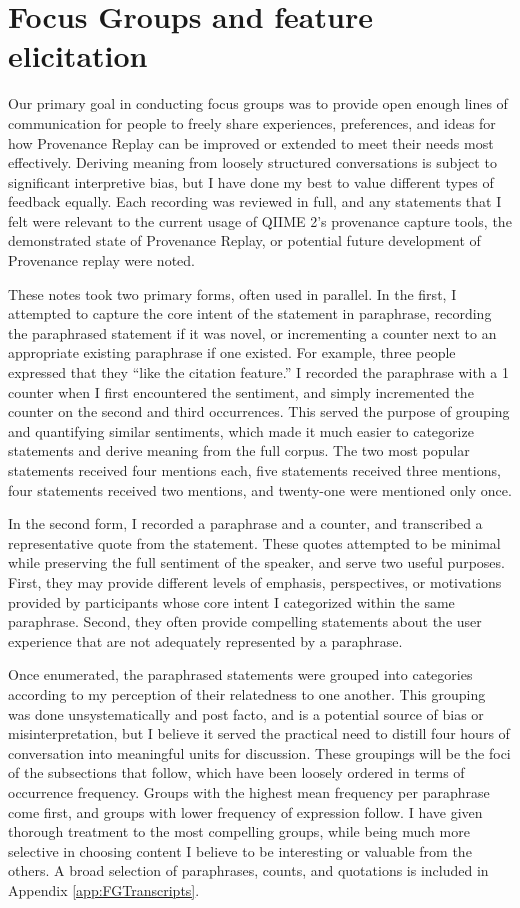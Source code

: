 \section{Focus Groups and feature elicitation}

Our primary goal in conducting focus groups was to provide open enough lines of
communication for people to freely share experiences, preferences, and ideas for
how Provenance Replay can be improved or extended to meet their needs most
effectively. Deriving meaning from loosely structured conversations is subject
to significant interpretive bias, but I have done my best to value different
types of feedback equally. Each recording was reviewed in full, and any
statements that I felt were relevant to the current usage of QIIME 2’s
provenance capture tools, the demonstrated state of Provenance Replay, or
potential future development of Provenance replay were noted. 

These notes took two primary forms, often used in parallel. In the first, I
attempted to capture the core intent of the statement in paraphrase, recording
the paraphrased statement if it was novel, or incrementing a counter next to an
appropriate existing paraphrase if one existed. For example, three people
expressed that they “like the citation feature.” I recorded the paraphrase with
a 1 counter when I first encountered the sentiment, and simply incremented the
counter on the second and third occurrences. This served the purpose of grouping
and quantifying similar sentiments, which made it much easier to categorize
statements and derive meaning from the full corpus. The two most popular
statements received four mentions each, five statements received three mentions,
four statements received two mentions, and twenty-one were mentioned only once.

In the second form, I recorded a paraphrase and a counter, and transcribed a
representative quote from the statement. These quotes attempted to be minimal
while preserving the full sentiment of the speaker, and serve two useful
purposes. First, they may provide different levels of emphasis, perspectives, or
motivations provided by participants whose core intent I categorized within the
same paraphrase. Second, they often provide compelling statements about the user
experience that are not adequately represented by a paraphrase.

Once enumerated, the paraphrased statements were grouped into categories
according to my perception of their relatedness to one another. This grouping
was done unsystematically and post facto, and is a potential source of bias or
misinterpretation, but I believe it served the practical need to distill four
hours of conversation into meaningful units for discussion. These groupings will
be the foci of the subsections that follow, which have been loosely ordered in
terms of occurrence frequency. Groups with the highest mean frequency per
paraphrase come first, and groups with lower frequency of expression follow. I
have given thorough treatment to the most compelling groups, while being much
more selective in choosing content I believe to be interesting or valuable from
the others. A broad selection of paraphrases, counts, and quotations is included
in Appendix \ref{app:FGTranscripts}.

